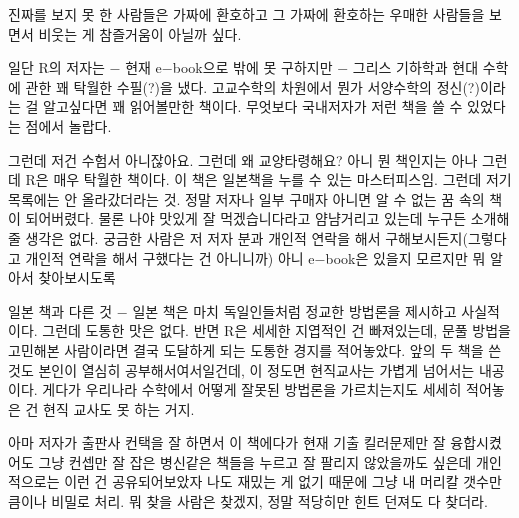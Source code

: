 진짜를 보지 못 한 사람들은 가짜에 환호하고
그 가짜에 환호하는 우매한 사람들을 보면서 비웃는 게 참즐거움이 아닐까 싶다.
\vspace{5mm}

일단 R의 저자는 $-$ 현재 e$-$book으로 밖에 못 구하지만 $-$
그리스 기하학과 현대 수학에 관한 꽤 탁월한 수필(?)을 냈다.
고교수학의 차원에서 뭔가 서양수학의 정신(?)이라는 걸 알고싶다면 꽤 읽어볼만한 책이다.
무엇보다 국내저자가 저런 책을 쓸 수 있었다는 점에서 놀랍다.
\vspace{5mm}

그런데 저건 수험서 아니잖아요. 그런데 왜 교양타령해요? 아니 뭔 책인지는 아나
그런데 R은 매우 탁월한 책이다. 이 책은 일본책을 누를 수 있는 마스터피스임.
그런데 저기 목록에는 안 올라갔더라는 것. 정말 저자나 일부 구매자 아니면 알 수 없는 꿈 속의 책이 되어버렸다.
물론 나야 맛있게 잘 먹겠습니다라고 얌냠거리고 있는데 누구든 소개해줄 생각은 없다.
궁금한 사람은 저 저자 분과 개인적 연락을 해서 구해보시든지(그렇다고 개인적 연락을 해서 구했다는 건 아니니까)
아니 e$-$book은 있을지 모르지만 뭐 알아서 찾아보시도록
\vspace{5mm}

일본 책과 다른 것 $-$ 일본 책은 마치 독일인들처럼 정교한 방법론을 제시하고 사실적이다. 그런데 도통한 맛은 없다.
반면 R은 세세한 지엽적인 건 빠져있는데, 문풀 방법을 고민해본 사람이라면 결국 도달하게 되는 도통한 경지를 적어놓았다.
앞의 두 책을 쓴 것도 본인이 열심히 공부해서여서일건데, 이 정도면 현직교사는 가볍게 넘어서는 내공이다.
게다가 우리나라 수학에서 어떻게 잘못된 방법론을 가르치는지도 세세히 적어놓은 건 현직 교사도 못 하는 거지.
\vspace{5mm}

아마 저자가 출판사 컨택을 잘 하면서 이 책에다가 현재 기출 킬러문제만 잘 융합시켰어도
그냥 컨셉만 잘 잡은 병신같은 책들을 누르고 잘 팔리지 않았을까도 싶은데
개인적으로는 이런 건 공유되어보았자 나도 재밌는 게 없기 때문에 그냥 내 머리칼 갯수만큼이나 비밀로 처리.
뭐 찾을 사람은 찾겠지, 정말 적당히만 힌트 던져도 다 찾더라.
\vspace{5mm}




